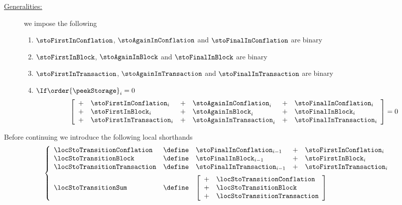 \begin{description}
	\item[\underline{\underline{Generalities:}}]
		we impose the following
		\begin{enumerate}
			\item $\stoFirstInConflation$,  $\stoAgainInConflation$  and $\stoFinalInConflation$  are binary
			\item $\stoFirstInBlock$,       $\stoAgainInBlock$       and $\stoFinalInBlock$       are binary
			\item $\stoFirstInTransaction$, $\stoAgainInTransaction$ and $\stoFinalInTransaction$ are binary
			\item $\If \order{\peekStorage} _{i} = 0$ \Then
				\[
					\left[ \begin{array}{clclcl}
						+ & \stoFirstInConflation   _{i} & + & \stoAgainInConflation   _{i} & + & \stoFinalInConflation   _{i} \\
						+ & \stoFirstInBlock        _{i} & + & \stoAgainInBlock        _{i} & + & \stoFinalInBlock        _{i} \\
						+ & \stoFirstInTransaction  _{i} & + & \stoAgainInTransaction  _{i} & + & \stoFinalInTransaction  _{i} \\
					\end{array} \right]
					=
					0
				\]
		\end{enumerate}
\end{description}
Before continuing we introduce the following local shorthands
\[
	\left\{ \begin{array}{lclcl}
		\locStoTransitionConflation  & \define & \stoFinalInConflation  _{i - 1} & + & \stoFirstInConflation  _{i}              \\
		\locStoTransitionBlock       & \define & \stoFinalInBlock       _{i - 1} & + & \stoFirstInBlock       _{i}              \\
		\locStoTransitionTransaction & \define & \stoFinalInTransaction _{i - 1} & + & \stoFirstInTransaction _{i} \vspace{2mm} \\
		\locStoTransitionSum         & \define &
		\multicolumn{3}{l}{
		\left[ \begin{array}{cl}
			+ & \locStoTransitionConflation   \\
			+ & \locStoTransitionBlock        \\
			+ & \locStoTransitionTransaction  \\
		\end{array} \right] } \\
	\end{array} \right.
\]
